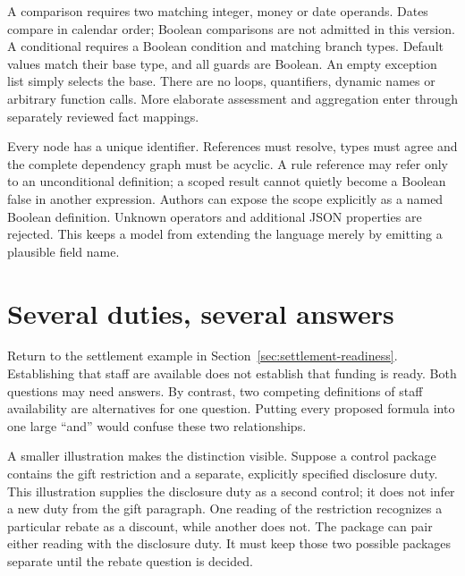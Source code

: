 A comparison requires two matching integer, money or date operands. Dates
compare in calendar order; Boolean comparisons are not admitted in this version.
A conditional requires a Boolean condition and matching branch types. Default
values match their base type, and all guards are Boolean. An empty exception
list simply selects the base. There are no loops, quantifiers, dynamic names or
arbitrary function calls. More elaborate assessment and aggregation enter
through separately reviewed fact mappings.

Every node has a unique identifier. References must resolve, types must agree
and the complete dependency graph must be acyclic. A rule reference may refer
only to an unconditional definition; a scoped result cannot quietly become a
Boolean false in another expression. Authors can expose the scope explicitly
as a named Boolean definition. Unknown operators and additional JSON properties
are rejected. This keeps a model from extending the language merely by emitting
a plausible field name.

\section{Several duties, several answers}
\label{sec:control-composition}

Return to the settlement example in Section~\ref{sec:settlement-readiness}.
Establishing that staff are available does not establish that funding is ready.
Both questions may need answers. By contrast, two competing definitions of
staff availability are alternatives for one question. Putting every proposed
formula into one large ``and'' would confuse these two relationships.

A smaller illustration makes the distinction visible. Suppose a control package
contains the gift restriction and a separate, explicitly specified disclosure
duty. This illustration supplies the disclosure duty as a second control; it
does not infer a new duty from the gift paragraph. One reading of the restriction
recognizes a particular rebate as a discount, while another does not. The
package can pair either reading with the disclosure duty. It must keep those
two possible packages separate until the rebate question is decided.

